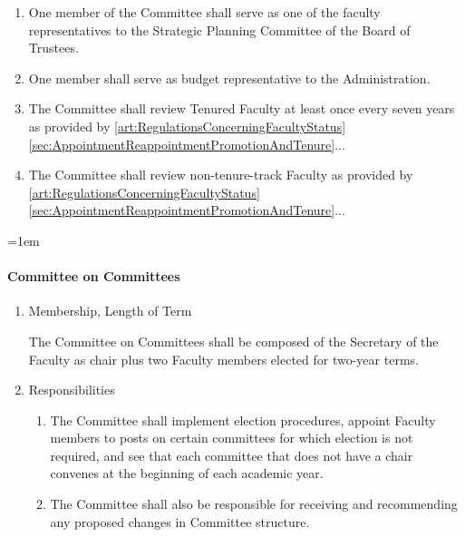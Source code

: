 \documentclass{manual}
\let\oldparagraph\paragraph
\renewcommand\paragraph{\leftskip=1em\oldparagraph}
\newcommand{\itemLevelA}{\alph*.}
\newcommand{\itemLevelB}{\arabic*)}
\newcommand{\itemRefA}{\alph*}
\newcommand{\itemRefB}{\arabic*}
\begin{document}
\begin{enumerate}[label=\itemLevelA,ref=\itemRefA]
\begin{enumerate}[label=\itemLevelB,ref=\itemRefB]
\item One member of the Committee shall serve as one of the faculty representatives to the Strategic Planning Committee of the Board of Trustees.
\item One member shall serve as budget representative to the Administration.
\item The Committee shall review Tenured Faculty at least once every seven years as provided by \cref{art:RegulationsConcerningFacultyStatus} \cref{sec:AppointmentReappointmentPromotionAndTenure}...
\item The Committee shall review non-tenure-track Faculty as provided by \cref{art:RegulationsConcerningFacultyStatus} \cref{sec:AppointmentReappointmentPromotionAndTenure}...

\end{enumerate}
\end{enumerate}

\paragraph{Committee on Committees}

\begin{enumerate}[label=\itemLevelA,ref=\itemRefA]
\item Membership, Length of Term

The Committee on Committees shall be composed of the Secretary of the Faculty as chair plus two Faculty members elected for two-year terms.
\item Responsibilities
\begin{enumerate}[label=\itemLevelB,ref=\itemRefB]
\item The Committee shall implement election procedures, appoint Faculty members to posts on certain committees for which election is not required, and see that each committee that does not have a chair convenes at the beginning of each academic year.
\item The Committee shall also be responsible for receiving and recommending any proposed changes in Committee structure.

\end{enumerate}
\end{enumerate}
\end{document}
